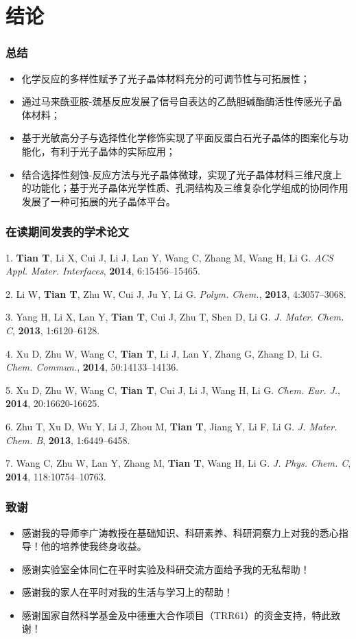 \documentclass{beamer}
\begin{document}
\section{结论}
\begin{frame}
  \frametitle{总结}
  \begin{itemize}[<+-| alert@+>]
    \item
    化学反应的多样性赋予了光子晶体材料充分的可调节性与可拓展性；
    \item
    通过马来酰亚胺-巯基反应发展了信号自表达的乙酰胆碱酯酶活性传感光子晶体材料；
    \item
    基于光敏高分子与选择性化学修饰实现了平面反蛋白石光子晶体的图案化与功能化，有利于光子晶体的实际应用；
    \item
    结合选择性刻蚀-反应方法与光子晶体微球，实现了光子晶体材料三维尺度上的功能化；基于光子晶体光学性质、孔洞结构及三维复杂化学组成的协同作用发展了一种可拓展的光子晶体平台。
  \end{itemize}
\end{frame}

\begin{frame}
  \frametitle{在读期间发表的学术论文}
  {
  \scriptsize
  1. \textbf{Tian T}, Li X, Cui J, Li J, Lan Y, Wang C, Zhang M, Wang H, Li G. \textit{ACS Appl. Mater. Interfaces}, \textbf{2014}, 6:15456–15465. 
  
  2. Li W, \textbf{Tian T}, Zhu W, Cui J, Ju Y, Li G. \textit{Polym. Chem.}, \textbf{2013}, 4:3057–3068.
  
  3. Yang H, Li X, Lan Y, \textbf{Tian T}, Cui J, Zhu T, Shen D, Li G. \textit{J. Mater. Chem. C}, \textbf{2013}, 1:6120–6128.
  
  4. Xu D, Zhu W, Wang C, \textbf{Tian T}, Li J, Lan Y, Zhang G, Zhang D, Li G. \textit{Chem. Commun.}, \textbf{2014}, 50:14133–14136.
  
  5. Xu D, Zhu W, Wang C, \textbf{Tian T}, Cui J, Li J, Wang H, Li G. \textit{Chem. Eur. J.}, \textbf{2014}, 20:16620-16625.
  
  6. Zhu T, Xu D, Wu Y, Li J, Zhou M, \textbf{Tian T}, Jiang Y, Li F, Li G. \textit{J. Mater. Chem. B}, \textbf{2013}, 1:6449–6458.
  
  7. Wang C, Zhu W, Lan Y, Zhang M, \textbf{Tian T}, Wang H, Li G. \textit{J. Phys. Chem. C}, \textbf{2014}, 118:10754–10763.

  
  }
\end{frame}

\begin{frame}
  \frametitle{致谢}
  \begin{itemize}
    \item
    感谢我的导师李广涛教授在基础知识、科研素养、科研洞察力上对我的悉心指导！他的培养使我终身收益。
    \item
    感谢实验室全体同仁在平时实验及科研交流方面给予我的无私帮助！
    \item
    感谢我的家人在平时对我的生活与学习上的帮助！
    \item
    感谢国家自然科学基金及中德重大合作项目（TRR61）的资金支持，特此致谢！
  \end{itemize}
\end{frame}
\end{document}
